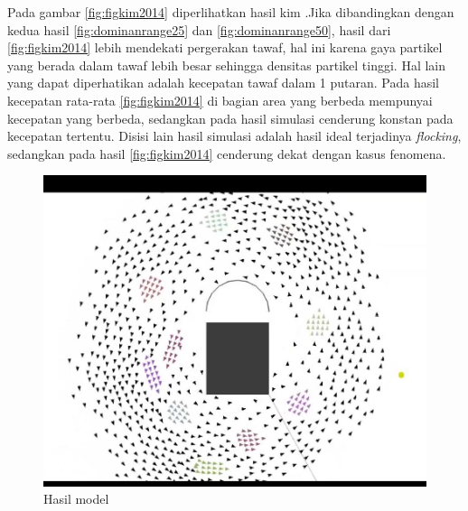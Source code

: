 \hspace{0.6cm} Pada gambar \ref{fig:figkim2014} diperlihatkan hasil kim .Jika dibandingkan dengan kedua hasil \ref{fig:dominanrange25} dan \ref{fig:dominanrange50}, hasil dari \ref{fig:figkim2014} lebih mendekati pergerakan tawaf, hal ini karena gaya partikel yang berada dalam tawaf lebih besar sehingga densitas partikel tinggi. Hal lain yang dapat diperhatikan adalah kecepatan tawaf dalam 1 putaran. Pada hasil kecepatan rata-rata \ref{fig:figkim2014} di bagian area yang berbeda mempunyai kecepatan yang berbeda, sedangkan pada hasil simulasi cenderung konstan pada kecepatan tertentu. Disisi lain hasil simulasi adalah hasil ideal terjadinya \textit{flocking}, sedangkan pada hasil \ref{fig:figkim2014} cenderung dekat dengan kasus fenomena.  
\begin{figure}
\centering
\includegraphics[scale=0.4]{gambar/PaperNasir.JPG}
\caption{Hasil model \citep{Nasir2016}}
\label{fig:nasir1}
\end{figure}
